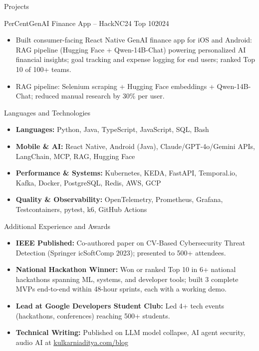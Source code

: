 \documentclass[]{mcdowellcv}
\begin{document}
\begin{cvsection}{Projects}
  \begin{cvsubsection}{PerCent}{GenAI Finance App -- HackNC24 Top 10}{2024}
    \begin{itemize}
      \item Built consumer-facing React Native GenAI finance app for iOS and Android: RAG pipeline (Hugging Face + Qwen-14B-Chat) powering personalized AI financial insights; goal tracking and expense logging for end users; ranked Top 10 of 100+ teams.
      \item RAG pipeline: Selenium scraping + Hugging Face embeddings + Qwen-14B-Chat; reduced manual research by 30\% per user.
    \end{itemize}
  \end{cvsubsection}
\end{cvsection}

\begin{cvsection}{Languages and Technologies}
  \begin{cvsubsection}{}{}{}
    \begin{itemize}
      \item \textbf{Languages:} Python, Java, TypeScript, JavaScript, SQL, Bash
      \item \textbf{Mobile \& AI:} React Native, Android (Java), Claude/GPT-4o/Gemini APIs, LangChain, MCP, RAG, Hugging Face
      \item \textbf{Performance \& Systems:} Kubernetes, KEDA, FastAPI, Temporal.io, Kafka, Docker, PostgreSQL, Redis, AWS, GCP
      \item \textbf{Quality \& Observability:} OpenTelemetry, Prometheus, Grafana, Testcontainers, pytest, k6, GitHub Actions
    \end{itemize}
  \end{cvsubsection}
\end{cvsection}

\begin{cvsection}{Additional Experience and Awards}
  \begin{cvsubsection}{}{}{}
    \begin{itemize}
      \item \textbf{IEEE Published:} Co-authored paper on CV-Based Cybersecurity Threat Detection (Springer icSoftComp 2023); presented to 500+ attendees.
      \item \textbf{National Hackathon Winner:} Won or ranked Top 10 in 6+ national hackathons spanning ML, systems, and developer tools; built 3 complete MVPs end-to-end within 48-hour sprints, each with a working demo.
      \item \textbf{Lead at Google Developers Student Club:} Led 4+ tech events (hackathons, conferences) reaching 500+ students.
      \item \textbf{Technical Writing:} Published on LLM model collapse, AI agent security, audio AI at \href{https://www.kulkarniaditya.com/blog}{kulkarniaditya.com/blog}
    \end{itemize}
  \end{cvsubsection}
\end{cvsection}
\end{document}
